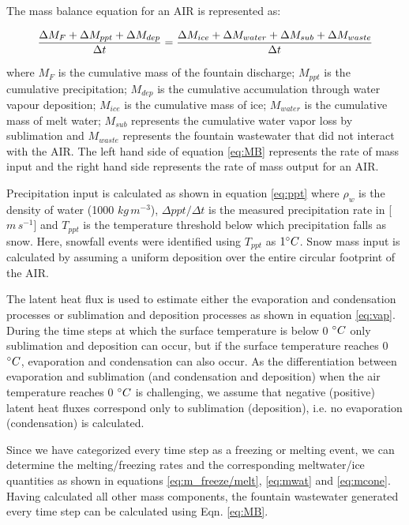 The mass balance equation for an AIR is represented as:

\begin{equation}
	\frac{\Delta M_{F} + \Delta M_{ppt} + \Delta M_{dep}}{\Delta t} = \frac{\Delta M_{ice} +\Delta M_{water} +
		\Delta M_{sub} + \Delta M_{waste}}{\Delta t}  \\
	\label{eq:MB}
\end{equation}

where $M_{F}$ is the cumulative mass of the fountain discharge; $M_{ppt}$ is the cumulative precipitation;  $M_{dep}$ is the cumulative
accumulation through water vapour deposition; $M_{ice}$ is the cumulative mass of ice; $M_{water}$ is the cumulative
mass of melt water; $M_{sub}$ represents the cumulative water vapor loss by sublimation and $M_{waste}$ represents the
fountain wastewater that did not interact with the AIR. The left hand side of equation \ref{eq:MB} represents the rate of
mass input and the right hand side represents the rate of mass output for an AIR.

Precipitation input is calculated as shown in equation \ref{eq:ppt} where $\rho_{w}$ is the density of water (1000
$kg\,m^{-3}$), $\Delta ppt/ \Delta t$ is the measured precipitation rate in [$m\,s^{-1}$] and $T_{ppt}$ is the temperature threshold
below which precipitation falls as snow. Here, snowfall events were identified using $T_{ppt}$ as $1 ^{\circ} C$. Snow
mass input is calculated by assuming a uniform deposition over the entire circular footprint of the AIR.

The latent heat flux is used to estimate either the evaporation and condensation processes or sublimation and deposition
processes as shown in equation \ref{eq:vap}. During the time steps at which the surface temperature is below 0 $^{\circ} C$ only
sublimation and deposition can occur, but if the surface temperature reaches 0 $^{\circ} C$, evaporation and condensation
can also occur. As the differentiation between evaporation and sublimation (and condensation and deposition) when the
air temperature reaches 0 $^{\circ} C$ is challenging, we assume that negative (positive) latent heat fluxes correspond
only to sublimation (deposition), i.e. no evaporation (condensation) is calculated.

Since we have categorized every time step as a freezing or melting event, we can determine the melting/freezing
rates and the corresponding meltwater/ice quantities as shown in equations \ref{eq:m_freeze/melt}, \ref{eq:mwat}
and \ref{eq:mcone}. Having calculated all other mass components, the fountain wastewater generated every
time step can be calculated using Eqn. \ref{eq:MB}.

